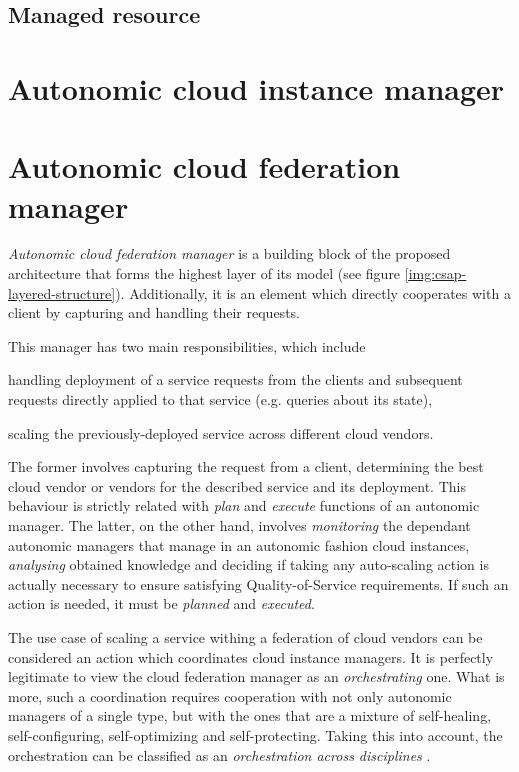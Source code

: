 \subsection{Managed resource}


\section{Autonomic cloud instance manager}

\section{Autonomic cloud federation manager}
\emph{Autonomic cloud federation manager} is a building block of the proposed architecture that forms the highest layer of its model (see figure \ref{img:csap-layered-structure}). Additionally, it is an element which directly cooperates with a client by capturing and handling their requests.

This manager has two main responsibilities, which include
\begin{inparaenum}[1)]
\item handling deployment of a service requests from the clients and subsequent requests directly applied to that service (e.g. queries about its state), 
\item scaling the previously-deployed service across different cloud vendors.
\end{inparaenum}
The former involves capturing the request from a client, determining the best cloud vendor or vendors for the described service and its deployment. This behaviour is strictly related with \emph{plan} and \emph{execute} functions of an autonomic manager. The latter, on the other hand, involves \emph{monitoring} the dependant autonomic managers that manage in an autonomic fashion cloud instances, \emph{analysing} obtained knowledge and deciding if taking any auto-scaling action is actually necessary to ensure satisfying Quality-of-Service requirements. If such an action is needed, it must be \emph{planned} and \emph{executed}.

The use case of scaling a service withing a federation of cloud vendors can be considered an action which coordinates cloud instance managers. It is perfectly legitimate to view the cloud federation manager as an \emph{orchestrating} one. What is more, such a coordination requires cooperation with not only autonomic managers of a single type, but with the ones that are a mixture of self-healing, self-configuring, self-optimizing and self-protecting. Taking this into account, the orchestration can be classified as an \emph{orchestration across disciplines} \cite{IBM06}.

